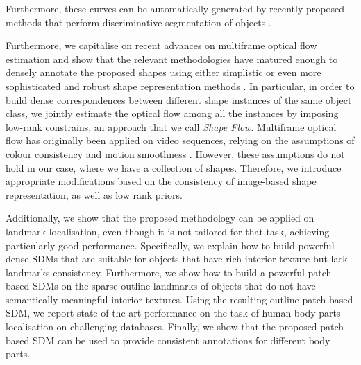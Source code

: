 Furthermore, these curves can be automatically generated by recently proposed methods that perform discriminative segmentation of objects \cite{luo2013pedestrian,liu2015matching}.

Furthermore, we capitalise on recent advances on multiframe optical flow estimation \cite{Garg:2013hu,tomasi2012dense,snape15faceflow} and show that the relevant methodologies have matured enough to densely annotate the proposed shapes using either simplistic or even more sophisticated and robust shape representation methods \cite{Nguyen2013}.
In particular, in order to build dense correspondences between different shape instances of the same object class, we jointly estimate the optical flow among all the instances by imposing low-rank constrains, an approach that we call \emph{Shape Flow}. Multiframe optical flow has originally been applied on video sequences, relying on the assumptions of colour consistency and motion smoothness \cite{Garg:2013hu}. However, these assumptions do not hold in our case, where we have a collection of shapes. Therefore, we introduce appropriate modifications based on the consistency of image-based shape representation, as well as low rank priors.


Additionally, we show that the proposed methodology can be applied on landmark localisation, even though it is not tailored for that task, achieving particularly good performance. Specifically, we explain how to build powerful dense SDMs that are suitable for objects that have rich interior texture but lack landmarks consistency. Furthermore, we show how to build a powerful patch-based SDMs on the sparse outline landmarks of objects that do not have semantically meaningful interior textures. Using the resulting outline patch-based SDM, we report state-of-the-art performance on the task of human body parts localisation on challenging databases. Finally, we show that the proposed patch-based SDM can be used to provide consistent annotations for different body parts.




